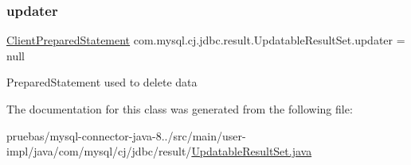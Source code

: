 \subsubsection{\texorpdfstring{updater}{updater}}
{\footnotesize\ttfamily \mbox{\hyperlink{classcom_1_1mysql_1_1cj_1_1jdbc_1_1_client_prepared_statement}{Client\+Prepared\+Statement}} com.\+mysql.\+cj.\+jdbc.\+result.\+Updatable\+Result\+Set.\+updater = null\hspace{0.3cm}{\ttfamily [protected]}}

Prepared\+Statement used to delete data 

The documentation for this class was generated from the following file\+:\begin{DoxyCompactItemize}
\item 
pruebas/mysql-\/connector-\/java-\/8../src/main/user-\/impl/java/com/mysql/cj/jdbc/result/\mbox{\hyperlink{_updatable_result_set_8java}{Updatable\+Result\+Set.\+java}}\end{DoxyCompactItemize}
